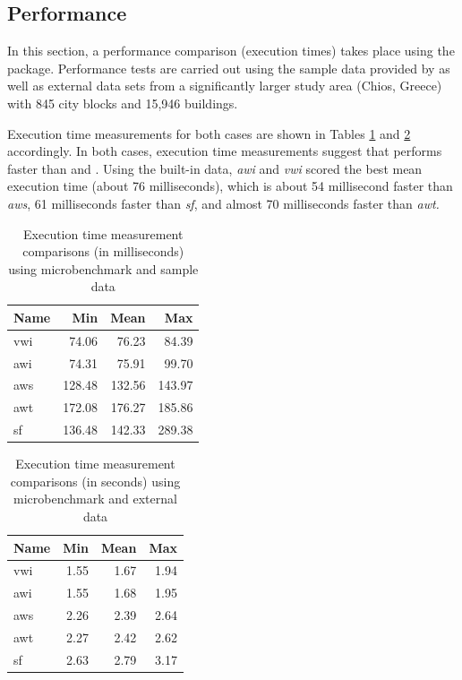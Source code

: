 \hypertarget{performance}{%
\subsection{Performance}\label{performance}}

In this section, a performance comparison (execution times) takes place using the 
package. Performance tests are carried out using the sample data provided by  as well as
external data sets from a significantly larger study area (Chios, Greece) with 845 city blocks and 15,946
buildings.

Execution time measurements for both cases are shown in Tables \ref{tab:bidp-ltx} and \ref{tab:chdp-ltx} accordingly. In both
cases, execution time measurements suggest that  performs faster than  and . Using the built-in data, \emph{awi} and \emph{vwi} scored the best mean execution time (about 76 milliseconds), which is about
54 millisecond faster than \emph{aws}, 61 milliseconds faster than \emph{sf}, and almost 70 milliseconds faster than
\emph{awt.}

\begin{table}

\caption{\label{tab:bidp-ltx}Execution time measurement comparisons (in milliseconds) using microbenchmark and sample data}
\centering
\fontsize{7}{9}\selectfont
\begin{tabular}[t]{l|r|r|r}
\hline
Name & Min & Mean & Max\\
\hline
vwi & 74.06 & 76.23 & 84.39\\
\hline
awi & 74.31 & 75.91 & 99.70\\
\hline
aws & 128.48 & 132.56 & 143.97\\
\hline
awt & 172.08 & 176.27 & 185.86\\
\hline
sf & 136.48 & 142.33 & 289.38\\
\hline
\end{tabular}
\end{table}

\begin{table}

\caption{\label{tab:chdp-ltx}Execution time measurement comparisons (in seconds) using microbenchmark and external
data}
\centering
\fontsize{7}{9}\selectfont
\begin{tabular}[t]{l|r|r|r}
\hline
Name & Min & Mean & Max\\
\hline
vwi & 1.55 & 1.67 & 1.94\\
\hline
awi & 1.55 & 1.68 & 1.95\\
\hline
aws & 2.26 & 2.39 & 2.64\\
\hline
awt & 2.27 & 2.42 & 2.62\\
\hline
sf & 2.63 & 2.79 & 3.17\\
\hline
\end{tabular}
\end{table}

